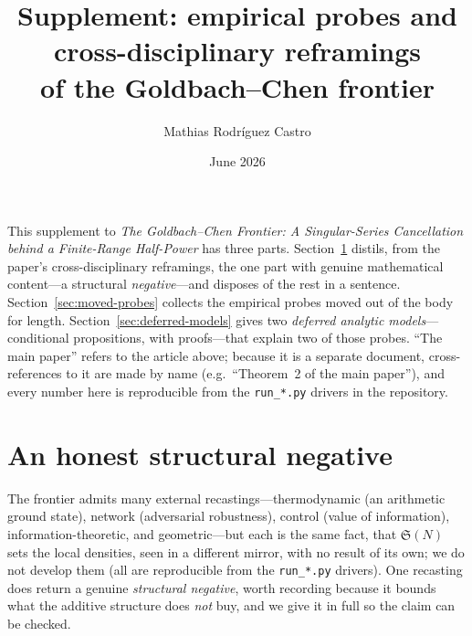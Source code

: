 \documentclass[11pt]{article}
\title{Supplement: empirical probes and cross-disciplinary reframings\\ of the Goldbach--Chen frontier}
\author{Mathias Rodr\'iguez Castro}
\date{June 2026}
\newcommand{\sing}{\mathfrak S}
\begin{document}
\maketitle
\noindent This supplement to \emph{The Goldbach--Chen Frontier: A Singular-Series Cancellation
behind a Finite-Range Half-Power} has three parts. Section~\ref{sec:reframings-brief} distils, from
the paper's cross-disciplinary reframings, the one part with genuine mathematical content---a
structural \emph{negative}---and disposes of the rest in a sentence. Section~\ref{sec:moved-probes}
collects the empirical probes moved out of the body for length. Section~\ref{sec:deferred-models}
gives two \emph{deferred analytic models}---conditional propositions, with proofs---that explain two
of those probes. ``The main paper'' refers to the article above; because it is a separate document,
cross-references to it are made by name (e.g.\ ``Theorem~2 of the main paper''), and every number
here is reproducible from the \texttt{run\_*.py} drivers in the repository.
\medskip

\section{An honest structural negative}
\label{sec:reframings-brief}

The frontier admits many external recastings---thermodynamic (an arithmetic ground state),
network (adversarial robustness), control (value of information), information-theoretic, and
geometric---but each is the same fact, that $\sing(N)$ sets the local densities, seen in a
different mirror, with no result of its own; we do not develop them (all are reproducible from the
\texttt{run\_*.py} drivers). One recasting does return a genuine \emph{structural negative}, worth
recording because it bounds what the additive structure does \emph{not} buy, and we give it in full
so the claim can be checked.
\end{document}
